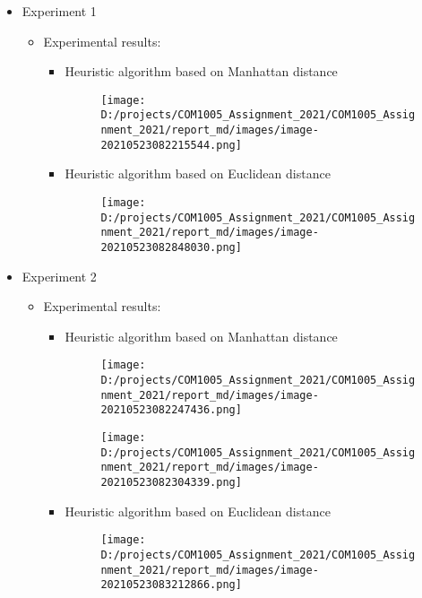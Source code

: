 \documentclass[
]{article}
\begin{document}
\begin{itemize}
\item
  Experiment 1

  \begin{itemize}
  \item
    Experimental results:

    \begin{itemize}
    \item
      Heuristic algorithm based on Manhattan distance

      \begin{figure}
      \centering
      \texttt{[image: D:/projects/COM1005\_Assignment\_2021/COM1005\_Assignment\_2021/report\_md/images/image-20210523082215544.png]}
      \caption{}
      \end{figure}
    \item
      Heuristic algorithm based on Euclidean distance

      \begin{figure}
      \centering
      \texttt{[image: D:/projects/COM1005\_Assignment\_2021/COM1005\_Assignment\_2021/report\_md/images/image-20210523082848030.png]}
      \caption{}
      \end{figure}
    \end{itemize}
  \end{itemize}
\item
  Experiment 2

  \begin{itemize}
  \item
    Experimental results:

    \begin{itemize}
    \item
      Heuristic algorithm based on Manhattan distance

      \begin{figure}
      \centering
      \texttt{[image: D:/projects/COM1005\_Assignment\_2021/COM1005\_Assignment\_2021/report\_md/images/image-20210523082247436.png]}
      \caption{}
      \end{figure}

      \begin{figure}
      \centering
      \texttt{[image: D:/projects/COM1005\_Assignment\_2021/COM1005\_Assignment\_2021/report\_md/images/image-20210523082304339.png]}
      \caption{}
      \end{figure}
    \item
      Heuristic algorithm based on Euclidean distance

      \begin{figure}
      \centering
      \texttt{[image: D:/projects/COM1005\_Assignment\_2021/COM1005\_Assignment\_2021/report\_md/images/image-20210523083212866.png]}
      \caption{}
      \end{figure}


\end{itemize}
\end{itemize}
\end{itemize}
\end{document}
